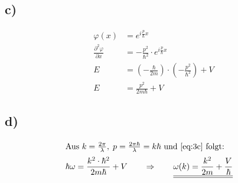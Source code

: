 \subsection{c)}

    \begin{align}
        \varphi(x) &= e^{i \frac{p}{\hbar} x}\\
        \frac{\partial^2 \varphi}{\partial x} &= - \frac{p^2}{\hbar^2} \cdot e^{i \frac{p}{\hbar} x}\\
        E &= (- \frac{\hbar}{2m}) \cdot (- \frac{p^2}{\hbar^2}) + V\\
        E &= \frac{p^2}{2m \hbar} + V \label{eq:3c}
    \end{align}

\subsection{d)}

    \begin{align}
        \intertext{Aus $k = \frac{2\pi}{\lambda}, \; p = \frac{2\pi \hbar}{\lambda} = k\hbar$ und \eqref{eq:3c} folgt:
        } 
        \hbar \omega &= \frac{k^2 \cdot \hbar^2}{2m\hbar} + V \qquad \Rightarrow \qquad \underline{\underline{\omega(k) = \frac{k^2}{2m} + \frac{V}{\hbar}}}
    \end{align}

